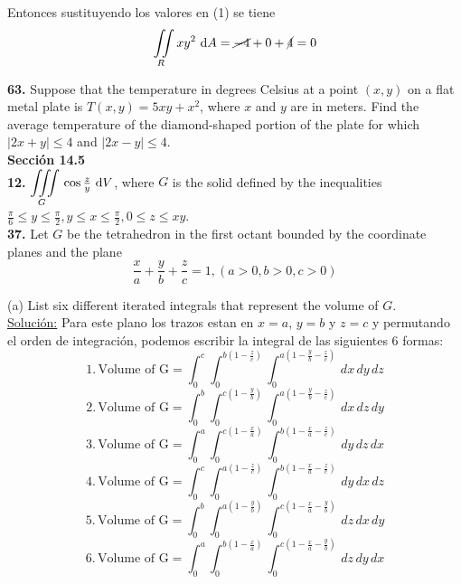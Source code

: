\documentclass[11pt]{report}
\newcommand{\s}{\underline{Soluci\'{o}n:}}
\begin{document}
Entonces sustituyendo los valores en (1) se tiene
\[{\displaystyle \iint \limits_R } \, xy^2 \, \, \text dA
= \cancel{-4} + 0 + \cancel{4} = 0\]

\textbf{63.} Suppose that the temperature in degrees Celsius at a point $(x, y)$
on a flat metal plate is $T(x, y) = 5xy + x^2 $, where $x$ and $y$ are in meters.
Find the average temperature of the diamond-shaped portion of the plate for which
$|2x + y| \leq 4$ and $|2x - y| \leq 4$. \\

\textbf{Sección 14.5} \\

\textbf{12.} $ {\displaystyle \iiint \limits_G } \, \cos{\frac{z}{y}} \, \, \text dV $,
where $G$ is the solid defined by the inequalities
$\frac{\pi}{6} \leq y \leq \frac{\pi}{2}, y \leq x \leq \frac{\pi}{2}, 0 \leq z \leq xy$. \\


\textbf{37.} Let $G$ be the tetrahedron in the first octant bounded by the
coordinate planes and the plane \\

\[ \frac{x}{a} + \frac{y}{b} + \frac{z}{c} = 1, (a > 0, b > 0, c > 0) \]

(a) List six different iterated integrals that represent the volume of $G$. \\
\s
Para este plano los trazos estan en $x = a$, $y = b$ y $z = c$ y permutando el
orden de integraci\'{o}n, podemos escribir la integral de las siguientes
6 formas:
$$1. \, \text{Volume of G} = \int^{c}_{0} \int^{b\left(1-\frac{z}{c}\right)}_{0}
                             \int^{a\left(1-\frac{y}{b}-\frac{z}{c}\right)}_{0}
                             \,dx \, dy \, dz$$
$$2. \, \text{Volume of G} = \int^{b}_{0} \int^{c\left(1-\frac{y}{b}\right)}_{0}
                             \int^{a\left(1-\frac{y}{b}-\frac{z}{c}\right)}_{0}
                             \, dx \, dz \, dy$$
$$3. \, \text{Volume of G} = \int^{a}_{0} \int^{c\left(1-\frac{x}{a}\right)}_{0}
                             \int^{b\left(1-\frac{x}{a}-\frac{z}{c}\right)}_{0}
                             \, dy \, dz \, dx$$
$$4. \, \text{Volume of G} = \int^{c}_{0} \int^{a\left(1-\frac{z}{c}\right)}_{0}
                             \int^{b\left(1-\frac{x}{a}-\frac{z}{c}\right)}_{0}
                             \, dy \, dx \, dz$$
$$5. \, \text{Volume of G} = \int^{b}_{0} \int^{a\left(1-\frac{y}{b}\right)}_{0}
                             \int^{c\left(1-\frac{x}{a}-\frac{y}{b}\right)}_{0}
                             \, dz \, dx \, dy$$
$$6. \, \text{Volume of G} = \int^{a}_{0} \int^{b\left(1-\frac{x}{a}\right)}_{0}
                             \int^{c\left(1-\frac{x}{a}-\frac{y}{b}\right)}_{0}
                             \, dz \, dy \, dx$$
\end{document}
